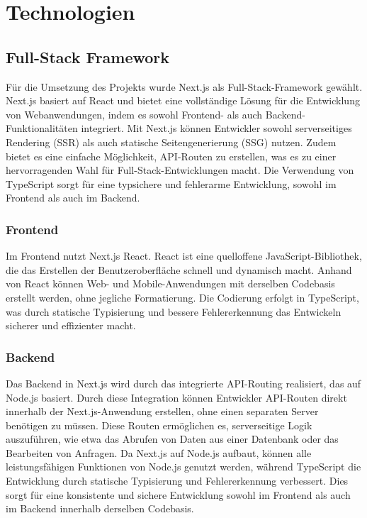 \documentclass[a4paper,12pt]{article}
\begin{document}

\section{Technologien}


\subsection{Full-Stack Framework}
Für die Umsetzung des Projekts wurde Next.js als Full-Stack-Framework gewählt. Next.js basiert auf React und bietet eine vollständige Lösung für die Entwicklung von Webanwendungen, indem es sowohl Frontend- als auch Backend-Funktionalitäten integriert. Mit Next.js können Entwickler sowohl serverseitiges Rendering (SSR) als auch statische Seitengenerierung (SSG) nutzen. Zudem bietet es eine einfache Möglichkeit, API-Routen zu erstellen, was es zu einer hervorragenden Wahl für Full-Stack-Entwicklungen macht. Die Verwendung von TypeScript sorgt für eine typsichere und fehlerarme Entwicklung, sowohl im Frontend als auch im Backend.


\subsubsection{Frontend}
Im Frontend nutzt Next.js React. React ist eine quelloffene JavaScript-Bibliothek, die das Erstellen der Benutzeroberfläche schnell und dynamisch macht. Anhand von React können Web- und Mobile-Anwendungen mit derselben Codebasis erstellt werden, ohne jegliche Formatierung. Die Codierung erfolgt in TypeScript, was durch statische Typisierung und bessere Fehlererkennung das Entwickeln sicherer und effizienter macht.


\subsubsection{Backend}
Das Backend in Next.js wird durch das integrierte API-Routing realisiert, das auf Node.js basiert. Durch diese Integration können Entwickler API-Routen direkt innerhalb der Next.js-Anwendung erstellen, ohne einen separaten Server benötigen zu müssen. Diese Routen ermöglichen es, serverseitige Logik auszuführen, wie etwa das Abrufen von Daten aus einer Datenbank oder das Bearbeiten von Anfragen. Da Next.js auf Node.js aufbaut, können alle leistungsfähigen Funktionen von Node.js genutzt werden, während TypeScript die Entwicklung durch statische Typisierung und Fehlererkennung verbessert. Dies sorgt für eine konsistente und sichere Entwicklung sowohl im Frontend als auch im Backend innerhalb derselben Codebasis.
\end{document}

